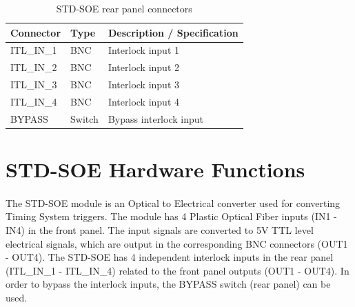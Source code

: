 \documentclass[openany]{article}
\begin{document}
	\begin{table}[!h]
	  \centering
	  \caption{STD-SOE rear panel connectors}
	  \label{tab:rear-panel-connectors}
	  \begin{tabular}{| m{3.5cm} m{4.0cm} m{7.0cm} |}
	    \hline
	    \bfseries Connector & \bfseries Type & \bfseries Description / Specification \\ \hline
	    ITL\_IN\_1 & BNC & Interlock input 1 \\ \hline
	    ITL\_IN\_2 & BNC & Interlock input 2 \\ \hline
	    ITL\_IN\_3 & BNC & Interlock input 3 \\ \hline
	    ITL\_IN\_4 & BNC & Interlock input 4 \\ \hline
	    BYPASS & Switch & Bypass interlock input \\ \hline
	  \end{tabular}
	\end{table}

\section{STD-SOE Hardware Functions}

	\paragraph{} The STD-SOE module is an Optical to Electrical converter used for converting Timing System triggers. The module has 4 Plastic Optical Fiber inputs (IN1 - IN4) in the front panel. The input signals are converted to 5V TTL level electrical signals, which are output in the corresponding BNC connectors (OUT1 - OUT4). The STD-SOE has 4 independent interlock inputs in the rear panel (ITL\_IN\_1 - ITL\_IN\_4) related to the front panel outputs (OUT1 - OUT4). In order to bypass the interlock inputs, the BYPASS switch (rear panel) can be used.
\end{document}
